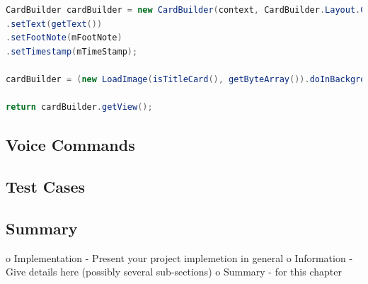 \begin{lstlisting}[language=Java, caption={Initialisation of the CardBuilder class}, label=todo]
CardBuilder cardBuilder = new CardBuilder(context, CardBuilder.Layout.COLUMNS);
.setText(getText())
.setFootNote(mFootNote)
.setTimestamp(mTimeStamp);

cardBuilder = (new LoadImage(isTitleCard(), getByteArray()).doInBackground(cardBuilder));

return cardBuilder.getView();
\end{lstlisting}


\subsection{Voice Commands}


\subsection{Test Cases}


\subsection{Summary}
\label{subsec:summary}


o   Implementation - Present your project implemetion in general
o   Information - Give details here (possibly several sub-sections)
o   Summary - for this chapter

% 
